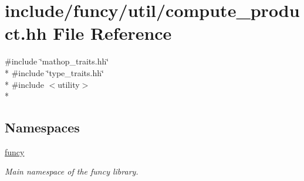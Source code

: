 \hypertarget{compute__product_8hh}{\section{include/funcy/util/compute\-\_\-product.hh File Reference}
\label{compute__product_8hh}
}
{\ttfamily \#include \char`\"{}mathop\-\_\-traits.\-hh\char`\"{}}\\*
{\ttfamily \#include \char`\"{}type\-\_\-traits.\-hh\char`\"{}}\\*
{\ttfamily \#include $<$utility$>$}\\*
\subsection*{Namespaces}
\begin{DoxyCompactItemize}
\item 
\hyperlink{namespacefuncy}{funcy}
\begin{DoxyCompactList}\small\item\em Main namespace of the funcy library. \end{DoxyCompactList}\end{DoxyCompactItemize}
